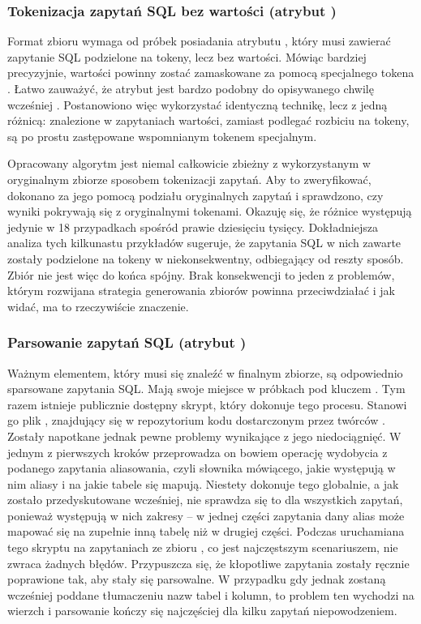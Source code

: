 \subsubsection{Tokenizacja zapytań SQL bez wartości (atrybut )}
Format zbioru  wymaga od próbek posiadania atrybutu , który musi zawierać zapytanie SQL podzielone na tokeny, lecz bez wartości. Mówiąc bardziej precyzyjnie, wartości powinny zostać zamaskowane za pomocą specjalnego tokena . Łatwo zauważyć, że atrybut  jest bardzo podobny do opisywanego chwilę wcześniej . Postanowiono więc wykorzystać identyczną technikę, lecz z jedną różnicą: znalezione w zapytaniach wartości, zamiast podlegać rozbiciu na tokeny, są po prostu zastępowane wspomnianym tokenem specjalnym. 

Opracowany algorytm jest niemal całkowicie zbieżny z wykorzystanym w oryginalnym zbiorze  sposobem tokenizacji zapytań. Aby to zweryfikować, dokonano za jego pomocą podziału oryginalnych zapytań i sprawdzono, czy wyniki pokrywają się z oryginalnymi tokenami. Okazuję się, że różnice występują jedynie w 18 przypadkach spośród prawie dziesięciu tysięcy. Dokładniejsza analiza tych kilkunastu przykładów sugeruje, że zapytania SQL w nich zawarte zostały podzielone na tokeny w niekonsekwentny, odbiegający od reszty sposób. Zbiór  nie jest więc do końca spójny. Brak konsekwencji to jeden z problemów, którym rozwijana strategia generowania zbiorów powinna przeciwdziałać i jak widać, ma to rzeczywiście znaczenie.

\subsubsection{Parsowanie zapytań SQL (atrybut )}
Ważnym elementem, który musi się znaleźć w finalnym zbiorze, są odpowiednio sparsowane zapytania SQL. Mają swoje miejsce w próbkach pod kluczem . Tym razem istnieje publicznie dostępny skrypt, który dokonuje tego procesu. Stanowi go plik , znajdujący się w repozytorium kodu  dostarczonym przez twórców . Zostały napotkane jednak pewne problemy wynikające z jego niedociągnięć. W jednym z pierwszych kroków przeprowadza on bowiem operację wydobycia z podanego zapytania aliasowania, czyli słownika mówiącego, jakie występują w nim aliasy i na jakie tabele się mapują. Niestety dokonuje tego globalnie, a jak zostało przedyskutowane wcześniej, nie sprawdza się to dla wszystkich zapytań, ponieważ występują w nich zakresy -- w jednej części zapytania dany alias może mapować się na zupełnie inną tabelę niż w drugiej części. Podczas uruchamiana tego skryptu na zapytaniach ze zbioru , co jest najczęstszym scenariuszem, nie zwraca żadnych błędów. Przypuszcza się, że kłopotliwe zapytania zostały ręcznie poprawione tak, aby stały się parsowalne. W przypadku gdy jednak zostaną wcześniej poddane tłumaczeniu nazw tabel i kolumn, to problem ten wychodzi na wierzch i parsowanie kończy się najczęściej dla kilku zapytań niepowodzeniem. 

